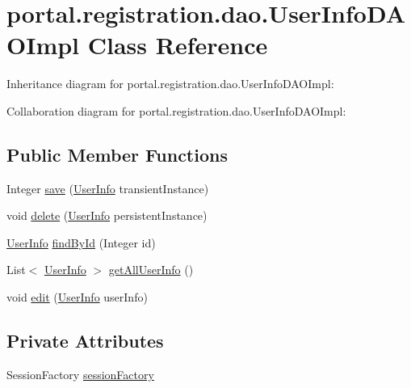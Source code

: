 \hypertarget{classportal_1_1registration_1_1dao_1_1UserInfoDAOImpl}{
\section{portal.registration.dao.UserInfoDAOImpl Class Reference}
\label{classportal_1_1registration_1_1dao_1_1UserInfoDAOImpl}
}


Inheritance diagram for portal.registration.dao.UserInfoDAOImpl:


Collaboration diagram for portal.registration.dao.UserInfoDAOImpl:
\subsection*{Public Member Functions}
\begin{DoxyCompactItemize}
\item 
Integer \hyperlink{classportal_1_1registration_1_1dao_1_1UserInfoDAOImpl_a3f31f85a673a72d80ac5fa47455c9fe2}{save} (\hyperlink{classportal_1_1registration_1_1domain_1_1UserInfo}{UserInfo} transientInstance)
\item 
void \hyperlink{classportal_1_1registration_1_1dao_1_1UserInfoDAOImpl_ab4b1070c7b7aa5dc7603998d387f9bff}{delete} (\hyperlink{classportal_1_1registration_1_1domain_1_1UserInfo}{UserInfo} persistentInstance)
\item 
\hyperlink{classportal_1_1registration_1_1domain_1_1UserInfo}{UserInfo} \hyperlink{classportal_1_1registration_1_1dao_1_1UserInfoDAOImpl_a30e4af0130b4f3f275cf0f7d75380975}{findById} (Integer id)
\item 
List$<$ \hyperlink{classportal_1_1registration_1_1domain_1_1UserInfo}{UserInfo} $>$ \hyperlink{classportal_1_1registration_1_1dao_1_1UserInfoDAOImpl_a0eaa3d897fdf2c63c4a18c03e6089c95}{getAllUserInfo} ()
\item 
void \hyperlink{classportal_1_1registration_1_1dao_1_1UserInfoDAOImpl_aee85fd8c887f40d7d6e0ebcb51ba68e2}{edit} (\hyperlink{classportal_1_1registration_1_1domain_1_1UserInfo}{UserInfo} userInfo)
\end{DoxyCompactItemize}
\subsection*{Private Attributes}
\begin{DoxyCompactItemize}
\item 
SessionFactory \hyperlink{classportal_1_1registration_1_1dao_1_1UserInfoDAOImpl_adf05657df384ecaac7c13700eae7fd9e}{sessionFactory}
\end{DoxyCompactItemize}

